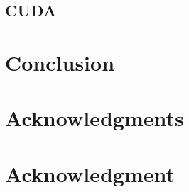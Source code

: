 \documentclass[conference,compsoc]{IEEEtran}
\begin{document}
\subsection{CUDA}

\section{Conclusion}

\ifCLASSOPTIONcompsoc
  \section*{Acknowledgments}
\else
  \section*{Acknowledgment}
\fi

\newpage
{}


\end{document}
